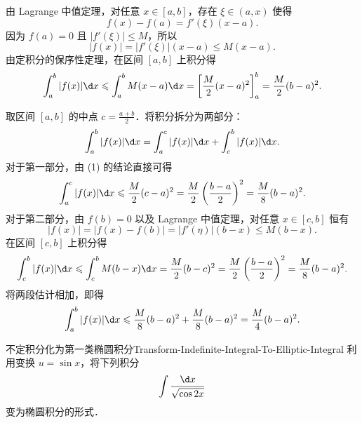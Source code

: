 \begin{solution}

    由 Lagrange 中值定理，对任意 $x \in [a, b]$，存在 $\xi \in (a, x)$ 使得
    \begin{equation}
        f(x) - f(a) = f'(\xi)(x - a).
    \end{equation}
    因为 $f(a) = 0$ 且 $|f'(\xi)| \leqslant M$，所以
    \begin{equation}
        |f(x)| = |f'(\xi)| (x - a) \leqslant M(x - a).
    \end{equation}
    由定积分的保序性定理，在区间 $[a, b]$ 上积分得
    \begin{equation}
        \int_a^b |f(x)| \d x \leqslant \int_a^b M(x - a) \d x = \left[ \frac{M}{2}(x - a)^2 \right]_a^b = \frac{M}{2}(b - a)^2.
    \end{equation}


    取区间 $[a, b]$ 的中点 $c = \frac{a + b}{2}$．将积分拆分为两部分：
    \begin{equation}
        \int_a^b |f(x)| \d x = \int_a^c |f(x)| \d x + \int_c^b |f(x)| \d x.
    \end{equation}
    对于第一部分，由 (1) 的结论直接可得
    \begin{equation}
        \int_a^c |f(x)| \d x \leqslant \frac{M}{2}(c - a)^2 = \frac{M}{2}\left( \frac{b - a}{2} \right)^2 = \frac{M}{8}(b - a)^2.
    \end{equation}
    对于第二部分，由 $f(b) = 0$ 以及 Lagrange 中值定理，对任意 $x \in [c, b]$ 恒有
    \begin{equation}
        |f(x)| = |f(x) - f(b)| = |f'(\eta)| (b - x) \leqslant M(b - x).
    \end{equation}
    在区间 $[c, b]$ 上积分得
    \begin{equation}
        \int_c^b |f(x)| \d x \leqslant \int_c^b M(b - x) \d x = \frac{M}{2}(b - c)^2 = \frac{M}{2}\left( \frac{b - a}{2} \right)^2 = \frac{M}{8}(b - a)^2.
    \end{equation}
    将两段估计相加，即得
    \begin{equation}
        \int_a^b |f(x)| \d x \leqslant \frac{M}{8}(b - a)^2 + \frac{M}{8}(b - a)^2 = \frac{M}{4}(b - a)^2.
    \end{equation}
\end{solution}

\begin{problem}{不定积分化为第一类椭圆积分}{Transform-Indefinite-Integral-To-Elliptic-Integral}
    利用变换 $u = \sin x$，将下列积分
    \begin{equation}
        \int \frac{\d x}{\sqrt{\cos 2x}}
    \end{equation}
    变为椭圆积分的形式．
\end{problem}

